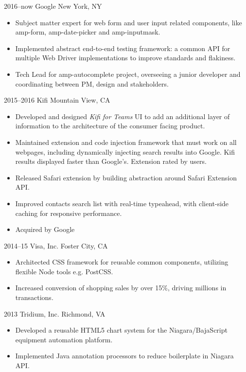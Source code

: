 \documentclass[]{cv-style}          %
\begin{document}
\begin{entrylist}

\entry
  {2016--now}
  {Google}
  {New York, NY}
  {
  \begin{itemize}
    \item Subject matter expert for web form and user input related components, like amp-form, amp-date-picker and amp-inputmask.
    \item Implemented abstract end-to-end testing framework: a common API for multiple Web Driver implementations to improve standards and flakiness.
    \item Tech Lead for amp-autocomplete project, overseeing a junior developer and coordinating between PM, design and stakeholders.
  \end{itemize}}
\entry
  {2015--2016}
  {Kifi}
  {Mountain View, CA}
  {
  \begin{itemize}
    \item Developed and designed \textit{Kifi for Teams} UI to add an additional layer of information to the architecture of the consumer facing product.
    \item Maintained extension and code injection framework that must work on all webpages, including dynamically injecting search results into Google. Kifi results displayed faster than Google's. Extension rated by users.
    \item Released Safari extension by building abstraction around Safari Extension API.
    \item Improved contacts search list with real-time typeahead, with client-side caching for responsive performance.
    \item Acquired by Google
  \end{itemize}}
\entry
  {2014--15}
  {Visa, Inc.}
  {Foster City, CA}
  {
  \begin{itemize}
    \item Architected CSS framework for reusable common components, utilizing flexible Node tools e.g. PostCSS.
    \item Increased conversion of shopping sales by over 15\%, driving millions in transactions.
  \end{itemize}}
\entry
  {2013}
  {Tridium, Inc.}
  {Richmond, VA}
  {
  \begin{itemize}
    \item Developed a reusable HTML5 chart system for the Niagara/BajaScript equipment automation platform.
    \item Implemented Java annotation processors to reduce boilerplate in Niagara API.
  \end{itemize}}
\end{entrylist}
\end{document}
